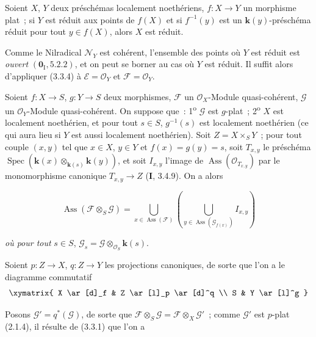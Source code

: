 \begin{corollary}[3.3.5]
\label{IV.2.3.3.5-fr}
Soient $X$, $Y$ deux préschémas localement noethériens, $f:X\to Y$ un
morphisme plat~; si $Y$ est réduit aux points de $f(X)$ et si $f^{-1}(y)$ est
un $\boldsymbol{k}(y)$-préschéma réduit pour tout $y\in f(X)$, alors $X$ est réduit.
\end{corollary}

Comme le Nilradical $\mathcal N_Y$ est cohérent, l'ensemble des points où $Y$
est réduit est \emph{ouvert} $(\mathbf{0}_{\mathrm I},5.2.2)$, et on peut se borner au
cas où $Y$ est réduit. Il suffit alors d'appliquer (3.3.4) à
$\mathcal E=\mathcal O_Y$ et $\mathcal F=\mathcal O_Y$.

\begin{proposition}[3.3.6]
\label{IV.2.3.3.6-fr}
Soient $f:X\to S$, $g:Y\to S$ deux morphismes, $\mathcal F$ un
$\mathcal O_X$-Module quasi-cohérent, $\mathcal G$ un $\mathcal O_Y$-Module
quasi-cohérent. On suppose que~: 1\textsuperscript{o} $\mathcal G$ est
$g$-plat~; 2\textsuperscript{o} $X$ est localement noethérien, et pour tout
$s\in S$, $g^{-1}(s)$ est localement noethérien (ce qui aura lieu si $Y$ est
aussi localement noethérien). Soit $Z=X\times_S Y$~; pour tout couple $(x,y)$
tel que $x\in X$, $y\in Y$ et
$f(x)=g(y)=s$, soit $T_{x,y}$ le préschéma
$\operatorname{Spec}(\boldsymbol{k}(x)\otimes_{\mathbf{k}(s)}\boldsymbol{k}(y))$, et soit $I_{x,y}$ l'image de
$\operatorname{Ass}(\mathcal O_{T_{x,y}})$ par le monomorphisme canonique
$T_{x,y}\to Z$ \textup{(\textbf{I}, 3.4.9)}. On a alors
\end{proposition}

\begin{env}[3.3.6.1]
\label{IV.2.3.3.6.1-fr}
\[
\operatorname{Ass}(\mathcal F\otimes_S\mathcal G)
=\bigcup_{x\in\operatorname{Ass}(\mathcal F)}
\left(\bigcup_{y\in\operatorname{Ass}(\mathcal G_{f(x)})}I_{x,y}\right)
\]
\end{env}

\textit{où pour tout} $s\in S$, $\mathcal G_s=\mathcal G\otimes_{\mathcal O_S}\boldsymbol{k}(s)$.

Soient $p:Z\to X$, $q:Z\to Y$ les projections canoniques, de sorte que l'on
a le diagramme commutatif
\[
\xymatrix{
X \ar[d]_f & Z \ar[l]_p \ar[d]^q \\
S & Y \ar[l]^g
}
\]

Posons $\mathcal G'=q^*(\mathcal G)$, de sorte que
$\mathcal F\otimes_S\mathcal G=\mathcal F\otimes_X\mathcal G'$~; comme
$\mathcal G'$ est $p$-plat (2.1.4), il résulte de (3.3.1) que l'on a

